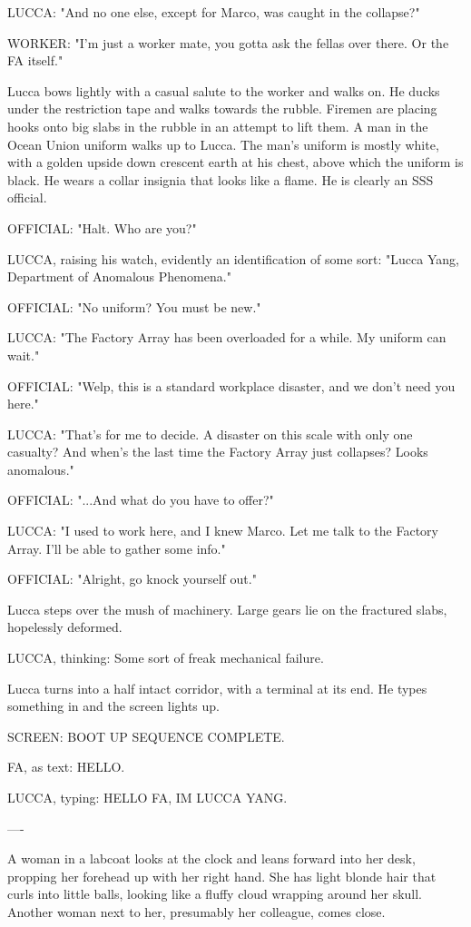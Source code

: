 \documentclass[11pt]{article}
\begin{document}
LUCCA: "And no one else, except for Marco, was caught in the collapse?"

WORKER: "I'm just a worker mate, you gotta ask the fellas over there. Or the FA itself."

Lucca bows lightly with a casual salute to the worker and walks on. 
He ducks under the restriction tape and walks towards the rubble. 
Firemen are placing hooks onto big slabs in the rubble in an attempt to lift them. 
A man in the Ocean Union uniform walks up to Lucca. 
The man's uniform is mostly white, with a golden upside down crescent earth at his chest, above which the uniform is black. 
He wears a collar insignia that looks like a flame. 
He is clearly an SSS official. 

OFFICIAL: "Halt. Who are you?"

LUCCA, raising his watch, evidently an identification of some sort: "Lucca Yang, Department of Anomalous Phenomena."

OFFICIAL: "No uniform? You must be new."

LUCCA: "The Factory Array has been overloaded for a while. My uniform can wait."

OFFICIAL: "Welp, this is a standard workplace disaster, and we don't need you here."

LUCCA: "That's for me to decide. A disaster on this scale with only one casualty? 
And when's the last time the Factory Array just collapses? Looks anomalous."

OFFICIAL: "...And what do you have to offer?"

LUCCA: "I used to work here, and I knew Marco. Let me talk to the Factory Array. I'll be able to gather some info."

OFFICIAL: "Alright, go knock yourself out." 

Lucca steps over the mush of machinery. 
Large gears lie on the fractured slabs, hopelessly deformed. 

LUCCA, thinking: Some sort of freak mechanical failure. 

Lucca turns into a half intact corridor, with a terminal at its end. 
He types something in and the screen lights up. 

SCREEN: BOOT UP SEQUENCE COMPLETE.

FA, as text: HELLO.

LUCCA, typing: HELLO FA, IM LUCCA YANG.

----

A woman in a labcoat looks at the clock and leans forward into her desk, propping her forehead up with her right hand.
She has light blonde hair that curls into little balls, looking like a fluffy cloud wrapping around her skull. 
Another woman next to her, presumably her colleague, comes close.
\end{document}
